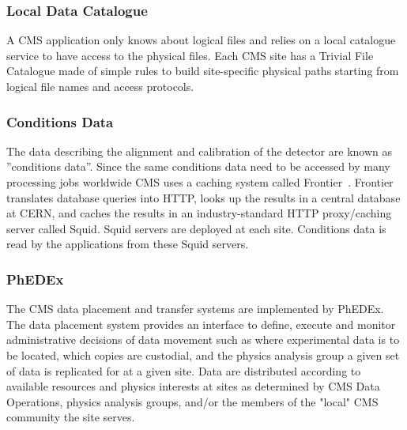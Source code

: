 \subsubsection{Local Data Catalogue}
\label{sec:3_1_2}
A CMS application only knows about logical files and relies on a local catalogue service to have access to the physical files.
Each CMS site has a Trivial File Catalogue made of simple rules to build site-specific physical paths starting from logical file names and access protocols.

\subsubsection{Conditions Data}
\label{sec:3_1_3}
The data describing the alignment and calibration of the detector are known as ''conditions data''. Since the same conditions data need to be accessed by many processing jobs worldwide CMS uses a caching system called Frontier~\cite{RefFrontier}.
Frontier translates database queries into HTTP, looks up the results in a central database at CERN, and caches the results in an industry-standard HTTP proxy/caching server called Squid. Squid servers are deployed at each site. Conditions data is read by the applications from these Squid servers.

\subsubsection{PhEDEx}
\label{sec:3_1_4}
The CMS data placement and transfer systems are implemented by
PhEDEx\cite{RefPhEDEx}. The data placement system provides an
interface to define, execute and monitor administrative decisions of
data movement such as where experimental data is to be located, which
copies are custodial, and %
the physics analysis group a given set of data is replicated for at a given site.
Data are distributed according to available resources
and physics interests at sites as determined by CMS Data Operations,
physics analysis groups, and/or the members of the "local" CMS community the site serves. 

